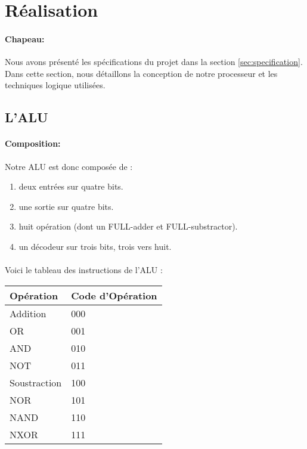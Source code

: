 \section{Réalisation}
\label{sec:Réalisation}

\paragraph{Chapeau:} Nous avons présenté les spécifications du projet dans la section \ref{sec:specification}. Dans cette section, nous détaillons la conception de notre processeur et les techniques logique utilisées.

\subsection{L'ALU}
\label{sec:re-ALU}

\paragraph{Composition:} Notre ALU est donc composée de :

\begin{enumerate}
\item deux entrées sur quatre bits.
\item une sortie sur quatre bits.
\item huit opération (dont un FULL-adder et FULL-substractor).
\item un décodeur sur trois bits, trois vers huit.
\end{enumerate}

\paragraph{} Voici le tableau des instructions de l'ALU :

\begin{center}
\begin{tabular} {|p{2cm}|p{3cm}|}
\hline
Opération & Code d'Opération \\
\hline
Addition & 000 \\
\hline
OR & 001 \\
\hline
AND & 010 \\
\hline
NOT & 011 \\
\hline
Soustraction & 100 \\
\hline
NOR & 101 \\
\hline
NAND & 110 \\
\hline
NXOR & 111 \\
\hline
\end{tabular}
\end{center}

